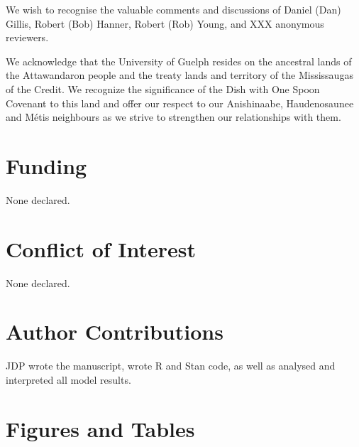 \documentclass[12pt]{article}
\begin{document}
We wish to recognise the valuable comments and discussions of Daniel (Dan) Gillis, Robert (Bob) Hanner, Robert (Rob) Young, and XXX anonymous reviewers.

We acknowledge that the University of Guelph resides on the ancestral lands of the Attawandaron people and the treaty lands and territory of the Mississaugas of the Credit. We recognize the significance of the Dish with One Spoon Covenant to this land and offer our respect to our Anishinaabe, Haudenosaunee and M{\'e}tis neighbours as we strive to strengthen our relationships with them.

\section*{Funding}

None declared.

\section*{Conflict of Interest}

None declared.

\section*{Author Contributions}

JDP wrote the manuscript, wrote R and Stan code, as well as analysed and interpreted all model results. 




\newpage

\section*{Figures and Tables}
\end{document}
